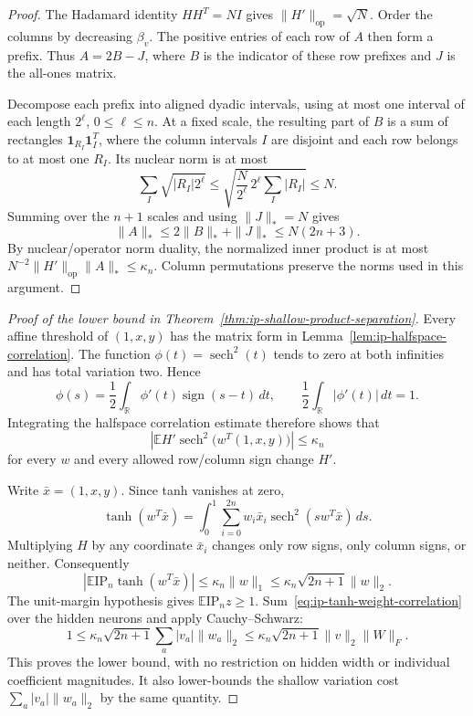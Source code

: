 \begin{proof}
The Hadamard identity $HH^T=NI$ gives
$\|H'\|_{\mathrm{op}}=\sqrt N$. Order the columns by decreasing
$\beta_v$. The positive entries of each row of $A$ then form a prefix.
Thus $A=2B-J$, where $B$ is the indicator of these row prefixes and
$J$ is the all-ones matrix.

Decompose each prefix into aligned dyadic intervals, using at most one
interval of each length $2^\ell$, $0\le\ell\le n$. At a fixed scale,
the resulting part of $B$ is a sum of rectangles
$\mathbf1_{R_I}\mathbf1_I^T$, where the column intervals $I$ are
disjoint and each row belongs to at most one $R_I$. Its nuclear norm
is at most
\[
 \sum_I\sqrt{|R_I|2^\ell}
 \le\sqrt{\frac{N}{2^\ell}\,2^\ell\sum_I|R_I|}
 \le N.
\]
Summing over the $n+1$ scales and using $\|J\|_*=N$ gives
\[
 \|A\|_*\le2\|B\|_*+\|J\|_*\le N(2n+3).
\]
By nuclear/operator norm duality, the normalized inner product is at
most $N^{-2}\|H'\|_{\mathrm{op}}\|A\|_*\le\kappa_n$.
Column permutations preserve the norms used in this argument.
\end{proof}

\begin{proof}[Proof of the lower bound in
Theorem~\ref{thm:ip-shallow-product-separation}]
Every affine threshold of $(1,x,y)$ has the matrix form in
Lemma~\ref{lem:ip-halfspace-correlation}. The function
$\phi(t)=\operatorname{sech}^2(t)$ tends to zero at both infinities
and has total variation two. Hence
\[
 \phi(s)=\frac12\int_{\mathbb R}\phi'(t)
                   \operatorname{sign}(s-t)\,dt,
 \qquad \frac12\int_{\mathbb R}|\phi'(t)|\,dt=1.
\]
Integrating the halfspace correlation estimate therefore shows that
\[
 \left|\mathbb E H'\operatorname{sech}^2
                   \bigl(w^T(1,x,y)\bigr)\right|\le\kappa_n
\]
for every $w$ and every allowed row/column sign change $H'$.

Write $\bar x=(1,x,y)$. Since tanh vanishes at zero,
\[
 \tanh(w^T\bar x)
 =\int_0^1\sum_{i=0}^{2n}w_i\bar x_i
                  \operatorname{sech}^2(sw^T\bar x)\,ds.
\]
Multiplying $H$ by any coordinate $\bar x_i$ changes only row signs,
only column signs, or neither. Consequently
\begin{equation}\label{eq:ip-tanh-weight-correlation}
 \left|\mathbb E\mathrm{IP}_n\tanh(w^T\bar x)\right|
 \le\kappa_n\|w\|_1
 \le\kappa_n\sqrt{2n+1}\|w\|_2.
\end{equation}
The unit-margin hypothesis gives $\mathbb E\mathrm{IP}_n z\ge1$.
Sum~\eqref{eq:ip-tanh-weight-correlation} over the hidden neurons and
apply Cauchy--Schwarz:
\[
 1\le\kappa_n\sqrt{2n+1}\sum_a|v_a|\|w_a\|_2
 \le\kappa_n\sqrt{2n+1}\|v\|_2\|W\|_F.
\]
This proves the lower bound, with no restriction on hidden width or
individual coefficient magnitudes. It also lower-bounds the shallow
variation cost $\sum_a|v_a|\|w_a\|_2$ by the same quantity.
\end{proof}


